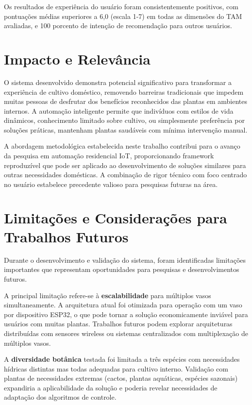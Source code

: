 Os resultados de experiência do usuário foram consistentemente positivos, com pontuações médias superiores a 6,0 (escala 1-7) em todas as dimensões do TAM avaliadas, e 100 porcento de intenção de recomendação para outros usuários.

\section{Impacto e Relevância}

O sistema desenvolvido demonstra potencial significativo para transformar a experiência de cultivo doméstico, removendo barreiras tradicionais que impedem muitas pessoas de desfrutar dos benefícios reconhecidos das plantas em ambientes internos. A automação inteligente permite que indivíduos com estilos de vida dinâmicos, conhecimento limitado sobre cultivo, ou simplesmente preferência por soluções práticas, mantenham plantas saudáveis com mínima intervenção manual.

A abordagem metodológica estabelecida neste trabalho contribui para o avanço da pesquisa em automação residencial IoT, proporcionando framework reproduzível que pode ser aplicado ao desenvolvimento de soluções similares para outras necessidades domésticas. A combinação de rigor técnico com foco centrado no usuário estabelece precedente valioso para pesquisas futuras na área.

\section{Limitações e Considerações para Trabalhos Futuros}

Durante o desenvolvimento e validação do sistema, foram identificadas limitações importantes que representam oportunidades para pesquisas e desenvolvimentos futuros.

A principal limitação refere-se à \textbf{escalabilidade} para múltiplos vasos simultaneamente. A arquitetura atual foi otimizada para operação com um vaso por dispositivo ESP32, o que pode tornar a solução economicamente inviável para usuários com muitas plantas. Trabalhos futuros podem explorar arquiteturas distribuídas com sensores wireless ou sistemas centralizados com multiplexação de múltiplos vasos.

A \textbf{diversidade botânica} testada foi limitada a três espécies com necessidades hídricas distintas mas todas adequadas para cultivo interno. Validação com plantas de necessidades extremas (cactos, plantas aquáticas, espécies sazonais) expandiria a aplicabilidade da solução e poderia revelar necessidades de adaptação dos algoritmos de controle.

